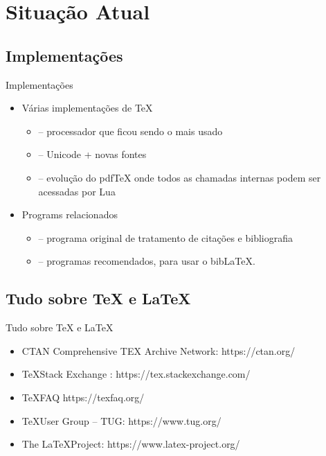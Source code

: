 \documentclass{beamer}
\begin{document}
\section{Situação Atual}

\subsection{Implementações}
\begin{frame}{Implementações}
\begin{itemize}
    \item Várias implementações de \TeX
    \begin{itemize}
        \item {} – processador que ficou sendo o mais usado
        \item {} – Unicode + novas fontes
        \item {} – evolução do pdfTeX onde todos as chamadas internas podem ser acessadas por Lua 
    \end{itemize}
    \item Programs relacionados
    \begin{itemize}
        \item {} – programa original de tratamento de citações e bibliografia
        \item {} – programas recomendados, para usar o bib\LaTeX.
        
    \end{itemize}
\end{itemize}
\end{frame}

\subsection{Tudo sobre \TeX{} e \LaTeX}
\begin{frame}{Tudo sobre \TeX{} e \LaTeX}
    \begin{itemize}
        \item CTAN Comprehensive TEX Archive Network: https://ctan.org/
        \item \TeX Stack Exchange :  https://tex.stackexchange.com/
        \item \TeX FAQ https://texfaq.org/
        \item \TeX User Group – TUG: https://www.tug.org/
        \item The \LaTeX Project: https://www.latex-project.org/
    \end{itemize}
\end{frame}
\end{document}
